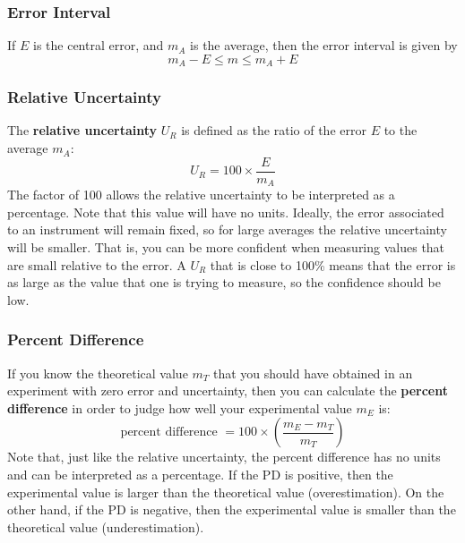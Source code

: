\subsubsection{Error Interval}
If $E$ is the central error, and $m_{A}$ is the average, then the error interval is given by
\begin{equation}
    m_{A} - E \leq m \leq m_{A} + E
\end{equation}
\subsubsection{Relative Uncertainty}
The \textbf{relative uncertainty} $U_{R}$ is defined as the ratio of the error $E$ to the average $m_{A}$:
\begin{equation}
    U_{R} = 100 \times \frac{E}{m_{A}}
\end{equation}
The factor of 100 allows the relative uncertainty to be interpreted as a percentage. Note that this value will have no units. Ideally, the error associated to an instrument will remain fixed, so for large averages the relative uncertainty will be smaller. That is, you can be more confident when measuring values that are small relative to the error. A $U_{R}$ that is close to 100\% means that the error is as large as the value that one is trying to measure, so the confidence should be low.
\subsubsection{Percent Difference}
If you know the theoretical value $m_{T}$ that you should have obtained in an experiment with zero error and uncertainty, then you can calculate the \textbf{percent difference} in order to judge how well your experimental value $m_{E}$ is:
\begin{equation}
    \text{percent difference } = 100 \times \left( \frac{m_{E} - m_{T}}{m_{T}} \right)
\end{equation}
Note that, just like the relative uncertainty, the percent difference has no units and can be interpreted as a percentage. If the PD is positive, then the experimental value is larger than the theoretical value (overestimation). On the other hand, if the PD is negative, then the experimental value is smaller than the theoretical value (underestimation).

